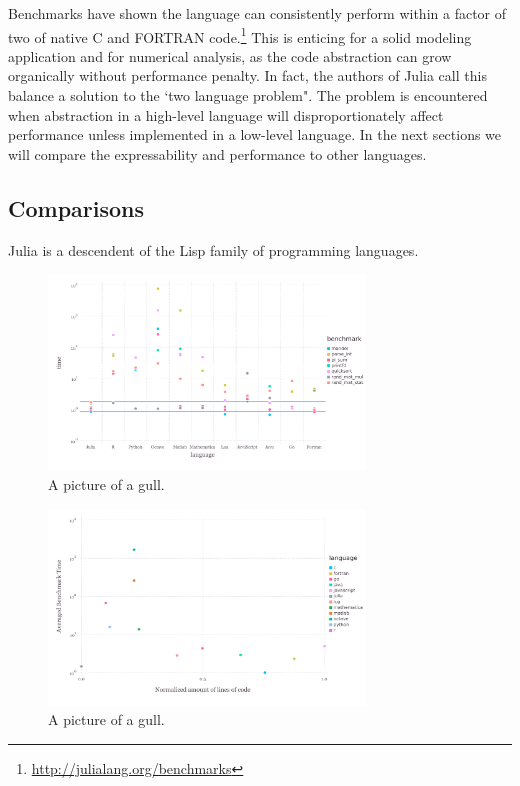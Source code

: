 \documentclass[a4paper]{article}
\begin{document}
Benchmarks have shown the language can consistently perform within a factor of
two of native C and FORTRAN code.\footnote{\url{http://julialang.org/benchmarks}}
This is enticing for a solid modeling application and for numerical analysis,
as the code abstraction can grow organically without performance penalty.
In fact, the authors of Julia call this balance a solution to the 
`two language problem". The problem is encountered when abstraction in a
high-level language will disproportionately affect performance unless
implemented in a low-level language. In the next sections we will compare
the expressability and performance to other languages.

\subsection{Comparisons}

Julia is a descendent of the Lisp family of programming languages.


\begin{figure}[h!]
  \label{fig:juliabench}
  \centering
    \includegraphics[width=0.75\textwidth]{img/juliabench.pdf}
  \caption{A picture of a gull.}
\end{figure}

\begin{figure}[h!]
  \centering
    \includegraphics[width=0.75\textwidth]{img/expressability.pdf}
  \caption{A picture of a gull.}
\end{figure}
\end{document}
